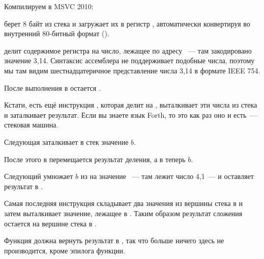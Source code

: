 
Компилируем в MSVC 2010:



\FLD берет 8 байт из стека и загружает их в регистр , автоматически конвертируя во внутренний 
80-битный формат ().

\FDIV делит содержимое регистра  на число, лежащее по адресу ~--- 
там закодировано значение 3,14. Синтаксис ассемблера не поддерживает подобные числа, 
поэтому мы там видим шестнадцатеричное представление числа 3,14 в формате IEEE 754.

После выполнения \FDIV в  остается .

Кстати, есть ещё инструкция \FDIVP, которая делит  на , 
выталкивает эти числа из стека и заталкивает результат. 
Если вы знаете язык Forth\FNURLFORTH, то это как раз оно и есть~--- стековая машина\FNURLSTACK.

Следующая \FLD заталкивает в стек значение $b$.

После этого в  перемещается результат деления, а в  теперь $b$.

Следующий \FMUL умножает $b$ из  на значение ~--- 
там лежит число 4,1~--- и оставляет результат в .

Самая последняя инструкция \FADDP складывает два значения из вершины стека 
в  и затем выталкивает значение, лежащее в . 
Таким образом результат сложения остается на вершине стека в .

Функция должна вернуть результат в , так что больше ничего здесь не производится, 
кроме эпилога функции.


